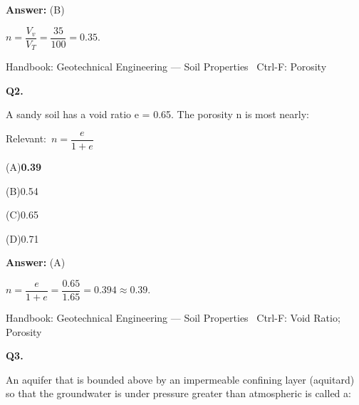 \documentclass[11pt]{article}
\newcommand{\correct}[1]{\textbf{#1}\;{\color{accent}$\checkmark$}}
\newcommand{\optline}[2]{\par\noindent\hspace{1.2em}(#1)\hspace{0.6em}#2}
\begin{document}
\vspace{2pt}\par\noindent\colorbox{boxbg}{\parbox{\dimexpr\linewidth-2\fboxsep\relax}{%
\vspace{2pt}\textbf{Answer:} (B)\par\vspace{2pt}
{\small $n = \dfrac{V_v}{V_T} = \dfrac{35}{100} = 0.35$.}\par\vspace{2pt}
{\footnotesize\color{soft}Handbook: Geotechnical Engineering --- Soil Properties \textbullet\ Ctrl-F: Porosity}\vspace{2pt}
}}
\vspace{9pt}
\filbreak
\textbf{\color{accent}Q2.}\par\vspace{2pt}
A sandy soil has a void ratio e = 0.65. The porosity n is most nearly:\par\vspace{3pt}
{\small\color{soft}Relevant:}\ $n = \dfrac{e}{1+e}$\par\vspace{3pt}
\optline{A}{\correct{0.39}}
\optline{B}{0.54}
\optline{C}{0.65}
\optline{D}{0.71}
\par\vspace{3pt}
\vspace{2pt}\par\noindent\colorbox{boxbg}{\parbox{\dimexpr\linewidth-2\fboxsep\relax}{%
\vspace{2pt}\textbf{Answer:} (A)\par\vspace{2pt}
{\small $n = \dfrac{e}{1+e} = \dfrac{0.65}{1.65} = 0.394 \approx 0.39$.}\par\vspace{2pt}
{\footnotesize\color{soft}Handbook: Geotechnical Engineering --- Soil Properties \textbullet\ Ctrl-F: Void Ratio; Porosity}\vspace{2pt}
}}
\vspace{9pt}
\filbreak
\textbf{\color{accent}Q3.}\par\vspace{2pt}
An aquifer that is bounded above by an impermeable confining layer (aquitard) so that the groundwater is under pressure greater than atmospheric is called a:\par\vspace{3pt}
\end{document}
